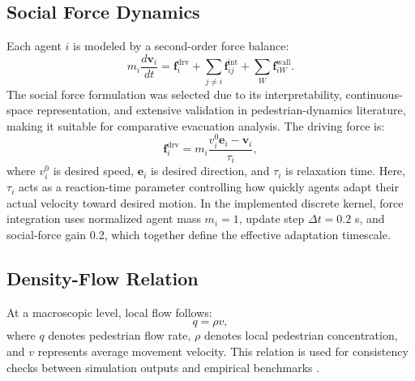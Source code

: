 \documentclass[utf8]{FrontiersinHarvard}
\begin{document}
\subsection{Social Force Dynamics}
Each agent $i$ is modeled by a second-order force balance:
\begin{equation}
    m_i \frac{d\mathbf{v}_i}{dt} = \mathbf{f}_i^{\mathrm{drv}} + \sum_{j\neq i}\mathbf{f}_{ij}^{\mathrm{int}} + \sum_{W}\mathbf{f}_{iW}^{\mathrm{wall}}.
    \label{eq:sfm_full}
\end{equation}
The social force formulation was selected due to its interpretability, continuous-space representation, and extensive validation in pedestrian-dynamics literature, making it suitable for comparative evacuation analysis.
The driving force is:
\begin{equation}
    \mathbf{f}_i^{\mathrm{drv}} = m_i\frac{v_i^0\mathbf{e}_i-\mathbf{v}_i}{\tau_i},
\end{equation}
where $v_i^0$ is desired speed, $\mathbf{e}_i$ is desired direction, and $\tau_i$ is relaxation time.
Here, $\tau_i$ acts as a reaction-time parameter controlling how quickly agents adapt their actual velocity toward desired motion.
In the implemented discrete kernel, force integration uses normalized agent mass $m_i=1$, update step $\Delta t=0.2$ s, and social-force gain 0.2, which together define the effective adaptation timescale.

\subsection{Density-Flow Relation}
At a macroscopic level, local flow follows:
\begin{equation}
    q = \rho v,
    \label{eq:qrv}
\end{equation}
where $q$ denotes pedestrian flow rate, $\rho$ denotes local pedestrian concentration, and $v$ represents average movement velocity. This relation is used for consistency checks between simulation outputs and empirical benchmarks \cite{fruin,weidmann1993}.
\end{document}
